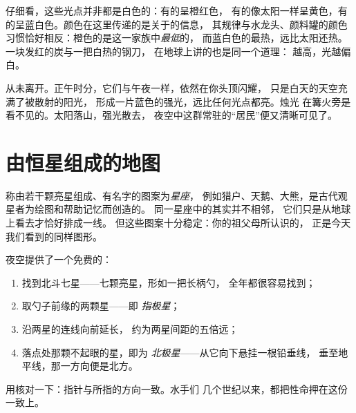\begin{example}[恒星的颜色]\label{ex:g5:stars-night-sky:colors}
仔细看，这些光点并非都是白色的：有的呈橙红色，
有的像太阳一样呈黄色，有的呈蓝白色。颜色在这里传递的是关于的信息，
其规律与水龙头、颜料罐的颜色习惯恰好相反：橙色的是这一家族中\emph{最低}的，
而蓝白色的最热，远比太阳还热。
一块发红的炭与一把白热的钢刀，
在地球上讲的也是同一个道理：
越高，光越偏白。
\end{example}

\begin{remark}[恒星白天去了哪里]\label{rem:g5:stars-night-sky:daytime}
从未离开。正午时分，它们与午夜一样，依然在你头顶闪耀，
只是白天的天空充满了被散射的阳光，
形成一片蓝色的强光，远比任何光点都亮。烛光
在篝火旁是看不见的。太阳落山，强光散去，
夜空中这群常驻的“居民”便又清晰可见了。
\end{remark}

\section{由恒星组成的地图}

\begin{definition}[星座]\label{def:g5:stars-night-sky:constellation}
称由若干颗亮星组成、有名字的图案为\emph{星座}，
例如猎户、天鹅、大熊，是古代观星者为绘图和帮助记忆而创造的。
同一星座中的其实并不相邻，
它们只是从地球上看去才恰好排成一线。
但这些图案十分稳定：你的祖父母所认识的，
正是今天我们看到的同样图形。
\end{definition}

\begin{method}[寻找北极星]\label{met:g5:stars-night-sky:northstar}
夜空提供了一个免费的：
\begin{enumerate}
  \item 找到北斗七星——七颗亮星，形如一把长柄勺，
        全年都很容易找到；
  \item 取勺子前缘的两颗星——即
        \emph{指极星}；
  \item 沿两星的连线向前延长，
        约为两星间距的五倍远；
  \item 落点处那颗不起眼的星，即为
        \emph{北极星}——从它向下悬挂一根铅垂线，
        垂至地平线，那一方向便是北方。
\end{enumerate}
用核对一下：指针与所指的方向一致。水手们
几个世纪以来，都把性命押在这份一致上。
\end{method}

